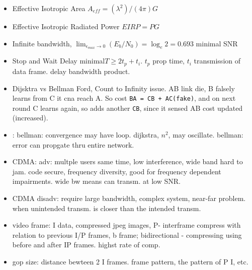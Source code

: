 \documentclass[10pt, landscape, oneside]{article}
\begin{document}
\begin{multicols}{6}
\begin{itemize}
\item Effective Isotropic Area $A_{eff}=(\lambda^2)/(4\pi)G$

\item Effective Isotropic Radiated Power $EIRP = PG$

\item Infinite bandwidth, $\lim_{\epsilon_{max}\to 0}(E_b/N_0)=\log_e2 = 0.693$ minimal SNR

\item Stop and Wait Delay minimal$T\geq 2t_p + t_i$. $t_p$ prop time, $t_i$ transmission of data frame. delay bandwidth product.

\item Dijsktra vs Bellman Ford, Count to Infinity issue. AB link die, B falsely learns from C it cna reach A. So cost \verb|BA = CB + AC(fake)|, and on next round C learns again, so adds another \verb|CB|, since it sensed AB cost updated (increased).
\item: bellman: convergence may have loop. dijkstra, $n^2$, may oscillate. bellman: error can propgate thru entire network.
\item CDMA: adv: multple users same time, low interference, wide band hard to jam. code secure, frequency diversity, good for frequency dependent impairments. wide bw means can transm. at low SNR.
\item CDMA disadv: require large bandwidth, complex system, near-far problem. when unintended transm. is closer than the intended transm.
\item video frame: I data, compressed jpeg images, P- interframe compress with relation to previous I/P frames, b frame; bidirectional - compressing using before and after IP frames. highst rate of comp.
\item gop size: distance bewteen 2 I frames. frame pattern, the pattern of P I, etc.

\end{itemize}
\end{multicols}
\end{document}
